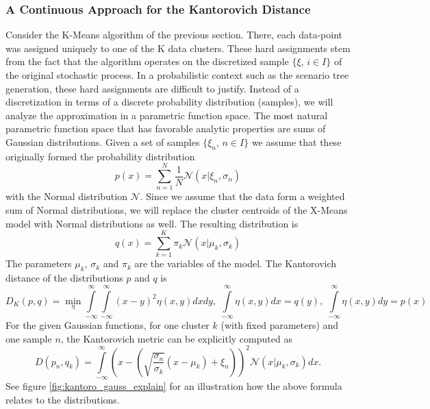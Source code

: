 \subsubsection{A Continuous Approach for the Kantorovich Distance}
\label{sec:cont-appr-kant}
Consider the K-Means algorithm of the previous section.
There, each data-point was assigned uniquely to one of the K data clusters.
These hard assignments stem from the fact that the algorithm operates on the discretized sample $\{\xi,\, i\in I\}$ of the original stochastic process.
In a probabilistic context such as the scenario tree generation, these hard assignments are difficult to justify.
Instead of a discretization in terms of a discrete probability distribution (samples), we will analyze the approximation in a parametric function space.
The most natural parametric function space that has favorable analytic properties are sums of Gaussian distributions.
Given a set of samples $\{\xi_n,\, n\in I\}$ we assume that these originally formed the probability distribution
\begin{equation}
  \label{eq:31}
  p(x) = \sum_{n=1}^N\frac{1}{N}\mathcal{N}(x|\xi_n,\sigma_n)
\end{equation}
with the Normal distribution $\mathcal{N}$.
Since we assume that the data form a weighted sum of Normal distributions, we will replace the cluster centroids of the X-Means model with Normal distributions as well. The resulting distribution is
\begin{equation}
  \label{eq:32}
  q(x) = \sum_{k=1}^K\pi_k\mathcal{N}(x|\mu_k, \sigma_k)
\end{equation}
The parameters $\mu_k$, $\sigma_k$ and $\pi_k$ are the variables of the model.
The Kantorovich distance of the distributions $p$ and $q$ is
\begin{equation}
  \label{eq:33}
  D_K(p,q) = \min\limits_{\eta}\int\limits_{-\infty}^{\infty}\int\limits_{-\infty}^{\infty}(x-y)^2\eta(x,y)dxdy,\; \int\limits_{-\infty}^{\infty}\eta(x,y)dx = q(y),\;\int\limits_{-\infty}^{\infty}\eta(x,y)dy = p(x)
\end{equation}
For the given Gaussian functions, for one cluster $k$ (with fixed parameters) and one sample $n$, the Kantorovich metric can be explicitly computed as
\begin{equation}
  \label{eq:34}
  D(p_n,q_k) = \int\limits_{-\infty}^{\infty}\left(x-\left(\sqrt{\frac{\sigma_n}{\sigma_k}}(x-\mu_k)+\xi_n\right)\right)^2\mathcal{N}(x|\mu_k,\sigma_k)dx.
\end{equation}
See figure \ref{fig:kantoro_gauss_explain} for an illustration how the above formula relates to the distributions.
